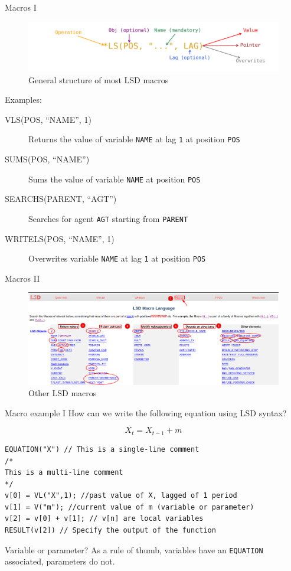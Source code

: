 \documentclass[bigger,aspectratio=169]{beamer}
\begin{document}
\begin{frame}[label={sec:org928d8d9},fragile]{Macros I}
 \begin{figure}[htbp]
\centering
\includegraphics[width=.9\linewidth]{./figs/Macros_LSD.pdf}
\caption{\label{}General structure of most LSD macros}
\end{figure}

Examples:
\begin{description}
\item[{VLS(POS, ``NAME'', 1)}] Returns the value of variable \texttt{NAME} at lag \texttt{1} at position \texttt{POS}
\item[{SUMS(POS, ``NAME'')}] Sums the value of variable \texttt{NAME} at position \texttt{POS}
\item[{SEARCHS(PARENT, ``AGT'')}] Searches for agent \texttt{AGT} starting from \texttt{PARENT}
\item[{WRITELS(POS, ``NAME'', 1)}] Overwrites variable \texttt{NAME} at lag \texttt{1} at position \texttt{POS}
\end{description}
\end{frame}
\begin{frame}[label={sec:org869b2c2}]{Macros II}
\begin{figure}[htbp]
\centering
\includegraphics[width=.9\linewidth]{figs/LSD_Macros_ScreenShot.png}
\caption{Other LSD macros}
\end{figure}
\end{frame}
\begin{frame}[label={sec:orgd02ebf4},fragile]{Macro example I}
 How can we write the following equation using LSD syntax?

\[X_{t} = X_{t-1} + m\]

\begin{verbatim}
EQUATION("X") // This is a single-line comment
/*
This is a multi-line comment
*/
v[0] = VL("X",1); //past value of X, lagged of 1 period
v[1] = V("m"); //current value of m (variable or parameter)
v[2] = v[0] + v[1]; // v[n] are local variables
RESULT(v[2]) // Specify the output of the function
\end{verbatim}
\begin{block}{Variable or parameter?}
As a rule of thumb, variables have an \texttt{EQUATION} associated, parameters do not.
\end{block}
\end{frame}
\end{document}
